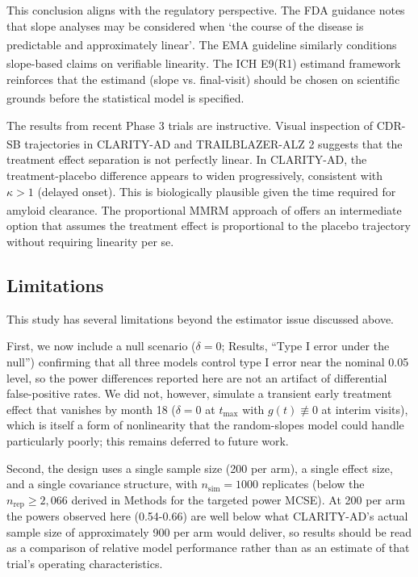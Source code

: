 \documentclass[
  11pt,
]{article}
\begin{document}
This conclusion aligns with the regulatory perspective. The
FDA guidance notes that slope analyses may be considered
when `the course of the disease is predictable and
approximately linear'\textsuperscript{}. The EMA guideline
similarly conditions slope-based claims on verifiable
linearity\textsuperscript{}. The ICH E9(R1) estimand
framework reinforces that the estimand (slope vs.
final-visit) should be chosen on scientific grounds before
the statistical model is specified\textsuperscript{}.

The results from recent Phase 3 trials are instructive.
Visual inspection of CDR-SB trajectories in CLARITY-AD\textsuperscript{} and TRAILBLAZER-ALZ 2\textsuperscript{} suggests that the treatment effect
separation is not perfectly linear. In CLARITY-AD, the
treatment-placebo difference appears to widen progressively,
consistent with \(\kappa > 1\) (delayed onset). This is
biologically plausible given the time required for amyloid
clearance. The proportional MMRM approach of\textsuperscript{} offers an intermediate option that
assumes the treatment effect is proportional to the placebo
trajectory without requiring linearity per se.

\subsection{Limitations}\label{limitations}

This study has several limitations beyond the estimator issue
discussed above.

First, we now include a null scenario (\(\delta = 0\); Results,
``Type I error under the null'') confirming that all three models
control type I error near the nominal 0.05 level, so the power
differences reported here are not an artifact of differential
false-positive rates. We did not, however, simulate a transient
early treatment effect that vanishes by month 18 (\(\delta = 0\)
at \(t_{\max}\) with \(g(t) \not\equiv 0\) at interim visits), which
is itself a form of nonlinearity that the random-slopes model
could handle particularly poorly; this remains deferred to
future work.

Second, the design uses a single sample size (200 per arm), a
single effect size, and a single covariance structure, with
\(n_{\mathrm{sim}} = 1000\) replicates (below the
\(n_{\mathrm{rep}} \geq 2{,}066\) derived in Methods for the
targeted power MCSE). At 200 per arm the powers observed here
(0.54-0.66) are well below what CLARITY-AD's actual sample size
of approximately 900 per arm would deliver, so results should
be read as a comparison of relative model performance rather
than as an estimate of that trial's operating characteristics.
\end{document}
